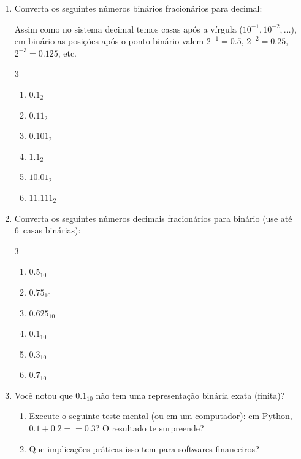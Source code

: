 \documentclass[11pt, a4paper]{article}
\begin{document}
\begin{enumerate}
\newpage
\item Converta os seguintes n\'{u}meros bin\'{a}rios fracion\'{a}rios para decimal:
\begin{contexto}
Assim como no sistema decimal temos casas ap\'{o}s a v\'{i}rgula ($10^{-1}, 10^{-2}, \ldots$), em bin\'{a}rio as posi\c{c}\~{o}es ap\'{o}s o ponto bin\'{a}rio valem $2^{-1} = 0.5$, $2^{-2} = 0.25$, $2^{-3} = 0.125$, etc.
\end{contexto}
\vspace{-2pt}
\begin{multicols}{3}
\begin{enumerate}
  \item $0.1_2$
  \item $0.11_2$
  \item $0.101_2$
  \item $1.1_2$
  \item $10.01_2$
  \item $11.111_2$
\end{enumerate}
\end{multicols}

\item Converta os seguintes n\'{u}meros decimais fracion\'{a}rios para bin\'{a}rio (use at\'{e} 6~casas bin\'{a}rias):
\begin{multicols}{3}
\begin{enumerate}
  \item $0.5_{10}$
  \item $0.75_{10}$
  \item $0.625_{10}$
  \item $0.1_{10}$
  \item $0.3_{10}$
  \item $0.7_{10}$
\end{enumerate}
\end{multicols}

\item Voc\^{e} notou que $0.1_{10}$ n\~{a}o tem uma representa\c{c}\~{a}o bin\'{a}ria exata (finita)?
\begin{enumerate}
  \item Execute o seguinte teste mental (ou em um computador): em Python, $0.1 + 0.2 == 0.3$? O resultado te surpreende?
  \item Que implica\c{c}\~{o}es pr\'{a}ticas isso tem para softwares financeiros?
\end{enumerate}


\end{enumerate}
\end{document}
